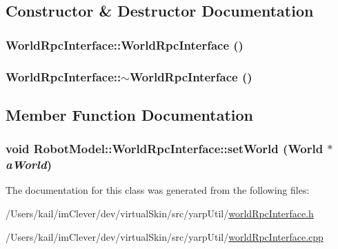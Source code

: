 \subsection{Constructor \& Destructor Documentation}
\hypertarget{class_robot_model_1_1_world_rpc_interface_a214bbac16ce3a3a94aa1bd600090ae2b}{
\subsubsection[{WorldRpcInterface}]{\setlength{\rightskip}{0pt plus 5cm}WorldRpcInterface::WorldRpcInterface ()}}
\label{class_robot_model_1_1_world_rpc_interface_a214bbac16ce3a3a94aa1bd600090ae2b}
\hypertarget{class_robot_model_1_1_world_rpc_interface_a6b990fdbe2cb39fc2d0e2ef9e8139250}{
\subsubsection[{$\sim$WorldRpcInterface}]{\setlength{\rightskip}{0pt plus 5cm}WorldRpcInterface::$\sim$WorldRpcInterface ()}}
\label{class_robot_model_1_1_world_rpc_interface_a6b990fdbe2cb39fc2d0e2ef9e8139250}


\subsection{Member Function Documentation}
\hypertarget{class_robot_model_1_1_world_rpc_interface_ae5a8361ea49e3bfb4218d7bcfd791587}{
\subsubsection[{setWorld}]{\setlength{\rightskip}{0pt plus 5cm}void RobotModel::WorldRpcInterface::setWorld ({\bf World} $\ast$ {\em aWorld})}}
\label{class_robot_model_1_1_world_rpc_interface_ae5a8361ea49e3bfb4218d7bcfd791587}


The documentation for this class was generated from the following files:\begin{DoxyCompactItemize}
\item 
/Users/kail/imClever/dev/virtualSkin/src/yarpUtil/\hyperlink{world_rpc_interface_8h}{worldRpcInterface.h}\item 
/Users/kail/imClever/dev/virtualSkin/src/yarpUtil/\hyperlink{world_rpc_interface_8cpp}{worldRpcInterface.cpp}\end{DoxyCompactItemize}

